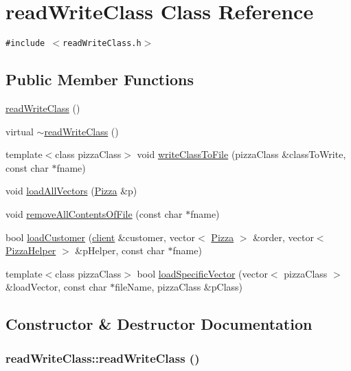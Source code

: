 \hypertarget{classread_write_class}{
\section{read\-Write\-Class Class Reference}
\label{classread_write_class}
}
{\tt \#include $<$read\-Write\-Class.h$>$}

\subsection*{Public Member Functions}
\begin{CompactItemize}
\item 
\hyperlink{classread_write_class_6db1c799fac571a924d5f276094c2b5c}{read\-Write\-Class} ()
\item 
virtual \hyperlink{classread_write_class_17d5dddd8a25946f62055c4d78fb22d8}{$\sim$read\-Write\-Class} ()
\item 
template$<$class pizza\-Class$>$ void \hyperlink{classread_write_class_abb1ed8e2de573d0548c582c8df29de1}{write\-Class\-To\-File} (pizza\-Class \&class\-To\-Write, const char $\ast$fname)
\item 
void \hyperlink{classread_write_class_7a6da2d64d652963e15693695f38b019}{load\-All\-Vectors} (\hyperlink{class_pizza}{Pizza} \&p)
\item 
void \hyperlink{classread_write_class_40de8d6c8e60d97ea037a48a0096fcfb}{remove\-All\-Contents\-Of\-File} (const char $\ast$fname)
\item 
bool \hyperlink{classread_write_class_b078183ae301dfe3e5197f25677d3abc}{load\-Customer} (\hyperlink{classclient}{client} \&customer, vector$<$ \hyperlink{class_pizza}{Pizza} $>$ \&order, vector$<$ \hyperlink{class_pizza_helper}{Pizza\-Helper} $>$ \&p\-Helper, const char $\ast$fname)
\item 
template$<$class pizza\-Class$>$ bool \hyperlink{classread_write_class_c853fce40cfb6790d054df75b933889f}{load\-Specific\-Vector} (vector$<$ pizza\-Class $>$ \&load\-Vector, const char $\ast$file\-Name, pizza\-Class \&p\-Class)
\end{CompactItemize}


\subsection{Constructor \& Destructor Documentation}
\hypertarget{classread_write_class_6db1c799fac571a924d5f276094c2b5c}{
\subsubsection[readWriteClass]{\setlength{\rightskip}{0pt plus 5cm}read\-Write\-Class::read\-Write\-Class ()}}
\label{classread_write_class_6db1c799fac571a924d5f276094c2b5c}


